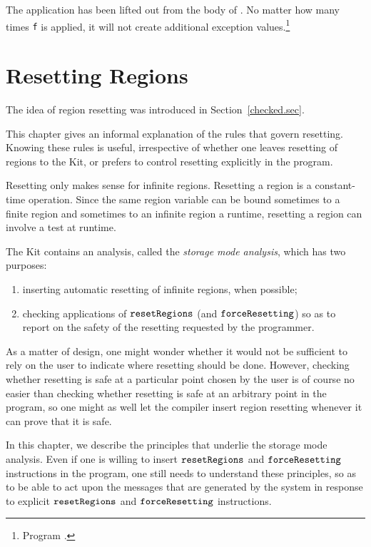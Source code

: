 \documentclass[12pt]{book}
\begin{document}
The application  has been lifted out from the body of
. No matter how many times {\tt f} is applied, it will not
create additional exception values.\footnote{Program
  .}

\chapter{Resetting Regions}
\label{storagemodes.sec}
The idea of region resetting was introduced
in Section~\ref{checked.sec}.
%

This chapter gives an informal explanation of the rules that
govern resetting. Knowing these rules is useful,
irrespective of whether one leaves resetting of regions to the
Kit, or prefers to control resetting explicitly in the program.

Resetting only makes sense for infinite regions. 
Resetting a region is a  constant-time operation.
Since the same region variable can be bound sometimes to a finite region
and sometimes to an infinite region a runtime, resetting a
region can involve a test at runtime.

The Kit contains an analysis, called the {\em storage mode analysis}, which has
two purposes:
\begin{enumerate}
\item inserting automatic resetting of infinite regions, when possible;
\item checking applications of $\hbox{\tt resetRegions}$ (and $\hbox{\tt forceResetting}$) so as to 
report on the safety of the resetting requested by the programmer.
\end{enumerate}

As a matter of design, one might wonder whether it would not be sufficient
to rely on the user to indicate where resetting should be done. However,
checking whether resetting is safe at a particular point chosen
by the user is of course no easier than checking whether resetting is safe
at an arbitrary point in the program, so one might as well let the compiler
insert region resetting whenever it can prove that it is safe. 

In this chapter, we describe the principles that underlie the storage
mode analysis. Even if one is willing to insert $\hbox{\tt resetRegions}$ and
$\hbox{\tt forceResetting}$ instructions in the program, one still needs to understand
these principles, so as to be able to act upon the messages that are
generated by the system in response to explicit $\hbox{\tt resetRegions}$ and
$\hbox{\tt forceResetting}$ instructions.
%
\end{document}
